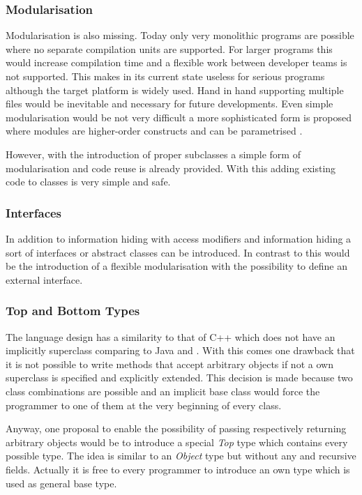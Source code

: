 \subsubsection{Modularisation}
Modularisation is also missing. Today only very monolithic programs
are possible where no separate compilation units are supported. For larger
programs this would increase compilation time and a flexible work between
developer teams is not supported. This makes \ooplss in its current state
useless for serious programs although the target platform is widely
used. Hand in hand supporting multiple files would be inevitable and
necessary for future developments.  Even simple modularisation would be
not very difficult a more sophisticated form is proposed where modules are
higher-order constructs and can be parametrised \cite{dreyer_type_2003}.

However, with the introduction of proper subclasses a simple form of
modularisation and code reuse is already provided. With this adding
existing code to classes is very simple and safe.

\subsubsection{Interfaces}
In addition to information hiding with access modifiers and information
hiding a sort of interfaces or abstract classes can be introduced. In 
contrast to this would be the introduction of a flexible modularisation
with the possibility to define an external interface.

\subsubsection{Top and Bottom Types}
The language design has a similarity to that of C++ which does
not have an implicitly superclass comparing to Java and \cs. With this
comes one drawback that it is not possible to write methods that accept
arbitrary objects if not a own superclass is specified and explicitly
extended. This decision is made because two class combinations are
possible and an implicit base class would force the programmer to one
of them at the very beginning of every class. 

Anyway, one proposal to enable the possibility of passing respectively
returning arbitrary objects would be to introduce a special \emph{Top}
type which contains every possible type. The idea is similar to an
\emph{Object} type but without any \mytype and recursive fields. Actually
it is free to every programmer to introduce an own type which is used 
as general base type.

